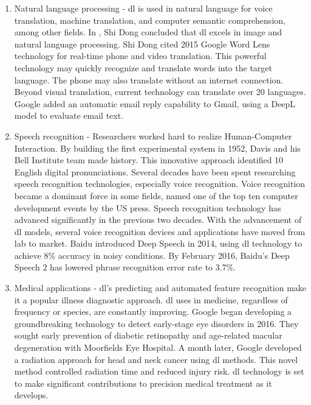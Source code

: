 \begin{enumerate}
    \item Natural language processing - \acrshort{dl} is used in natural language for voice translation, machine translation, and computer semantic comprehension, among other fields. In \cite{DONG2021100379}, Shi Dong concluded that \acrshort{dl} excels in image and natural language processing. Shi Dong cited 2015 Google Word Lens technology for real-time phone and video translation. This powerful technology may quickly recognize and translate words into the target language. The phone may also translate without an internet connection. Beyond visual translation, current technology can translate over 20 languages. Google added an automatic email reply capability to Gmail, using a DeepL model to evaluate email text.
    \item Speech recognition - Researchers worked hard to realize Human-Computer Interaction. By building the first experimental system in 1952, Davis and his Bell Institute team made history. This innovative approach identified 10 English digital pronunciations. Several decades have been spent researching speech recognition technologies, especially voice recognition. Voice recognition became a dominant force in some fields, named one of the top ten computer development events by the US press. Speech recognition technology has advanced significantly in the previous two decades. With the advancement of \acrshort{dl} models, several voice recognition devices and applications have moved from lab to market. Baidu \cite{Baidu} introduced Deep Speech in 2014, using \acrshort{dl} technology to achieve 8\% accuracy in noisy conditions. By February 2016, Baidu's Deep Speech 2 has lowered phrase recognition error rate to 3.7\%.
    \item Medical applications - \acrshort{dl}'s predicting and automated feature recognition make it a popular illness diagnostic approach. \acrshort{dl} uses in medicine, regardless of frequency or species, are constantly improving. Google began developing a groundbreaking technology to detect early-stage eye disorders in 2016. They sought early prevention of diabetic retinopathy and age-related macular degeneration with Moorfields Eye Hospital. A month later, Google developed a radiation approach for head and neck cancer using \acrshort{dl} methods. This novel method controlled radiation time and reduced injury risk. \acrshort{dl} technology is set to make significant contributions to precision medical treatment as it develops.


\end{enumerate}
